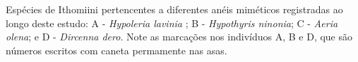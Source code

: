 \label{fig:2.1.1} Espécies de Ithomiini pertencentes a diferentes anéis miméticos registradas ao longo deste estudo: A - \textit{Hypoleria lavinia} ; B - \textit{Hypothyris ninonia}; C - \textit{Aeria olena}; e D - \textit{Dircenna dero}. Note as marcações nos indivíduos A, B e D, que são números escritos com caneta permamente nas asas. 
